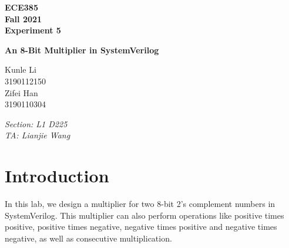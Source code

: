 \documentclass[11pt]{article}
\begin{document}
\begin{titlepage}
    \centering
    {\Huge\bfseries ECE385\\\Large Fall 2021\\\Large Experiment 5}

    \vspace{1cm}
    
    {\LARGE\bfseries An 8-Bit Multiplier in SystemVerilog}
    
    \vspace{2cm}
    
    {\Large Kunle Li\\3190112150\\Zifei Han\\3190110304}
    
    \vfill
    
    {\large\itshape Section: L1 D225\\TA: Lianjie Wang}
    \end{titlepage}

\tableofcontents
\section{Introduction}
In this lab, we design a multiplier for two 8-bit 2’s complement numbers in SystemVerilog. This multiplier can also perform operations like positive times positive, positive times negative, negative times positive and negative times negative, as well as consecutive multiplication.
\end{document}
